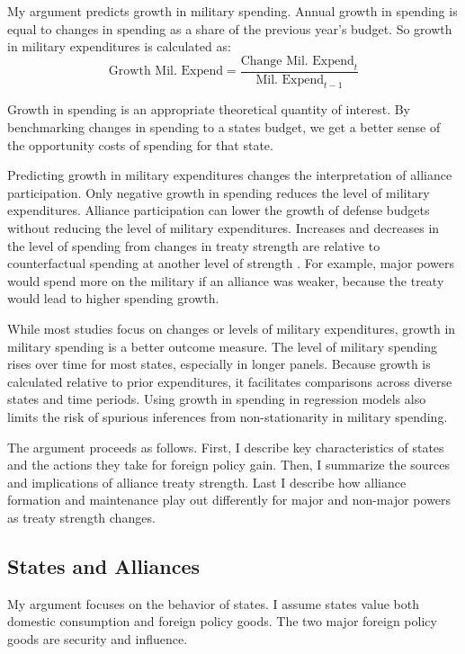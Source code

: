 \documentclass[12pt]{article}
\begin{document}
My argument predicts growth in military spending. 
Annual growth in spending is equal to changes in spending as a share of the previous year's budget. 
So growth in military expenditures is calculated as:
\begin{equation}
\mbox{Growth Mil. Expend} = \frac{ \mbox{Change Mil. Expend}_t }{ \mbox{Mil. Expend}_{t-1} }
\end{equation} 


Growth in spending is an appropriate theoretical quantity of interest. 
By benchmarking changes in spending to a states budget, we get a better sense of the opportunity costs of spending for that state. 


Predicting growth in military expenditures changes the interpretation of alliance participation. 
Only negative growth in spending reduces the level of military expenditures. 
Alliance participation can lower the growth of defense budgets without reducing the level of military expenditures. 
Increases and decreases in the level of spending from changes in treaty strength are relative to counterfactual spending at another level of strength \citep{Fearon1991}. 
For example, major powers would spend more on the military if an alliance was weaker, because the treaty would lead to higher spending growth. 


While most studies focus on changes or levels of military expenditures, growth in military spending is a better outcome measure. 
The level of military spending rises over time for most states, especially in longer panels. 
Because growth is calculated relative to prior expenditures, it facilitates comparisons across diverse states and time periods. 
Using growth in spending in regression models also limits the risk of spurious inferences from non-stationarity in military spending.


The argument proceeds as follows.
First, I describe key characteristics of states and the actions they take for foreign policy gain. 
Then, I summarize the sources and implications of alliance treaty strength. 
Last I describe how alliance formation and maintenance play out differently for major and non-major powers as treaty strength changes.  



\subsection{States and Alliances}


My argument focuses on the behavior of states. 
I assume states value both domestic consumption and foreign policy goods. 
The two major foreign policy goods are security and influence. 
\end{document}
